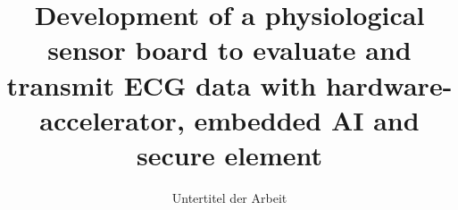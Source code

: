 \documentclass[
english,
]{bama}
\title{Development of a physiological sensor board to evaluate and transmit ECG data with hardware-accelerator, embedded AI and secure element}
\subtitle{Untertitel der Arbeit}
\begin{document}
	\frontmatter
	
	\maketitle
	
	\declaration
	
	
	
	\tableofcontents
	
	\printacronyms
	
	\mainmatter
	

	
	
	
	
	
	
	
	
	
	
	
	
	
	
	
	
	

	{\backmatter
		
		\printbibliography
		\listoffigures
		\listoftables
		
	}
	
	\appendix
	
	
	
\end{document}
